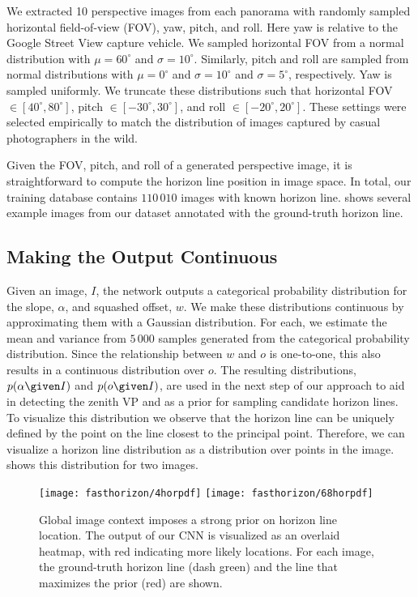 We extracted 10 perspective images from each panorama with randomly
sampled horizontal field-of-view (FOV), yaw, pitch, and roll. Here yaw
is relative to the Google Street View capture vehicle. We sampled
horizontal FOV from a normal distribution with $\mu=60^\circ$ and
$\sigma=10^\circ$. Similarly, pitch and roll are sampled from normal
distributions with $\mu=0^\circ$ and $\sigma=10^\circ$ and
$\sigma=5^\circ$, respectively. Yaw is sampled uniformly.  We truncate
these distributions such that horizontal FOV $\in [40^\circ,
80^\circ]$, pitch $\in [-30^\circ, 30^\circ]$, and roll $\in
[-20^\circ, 20^\circ]$. These settings were selected empirically to
match the distribution of images captured by casual photographers in
the wild.

Given the FOV, pitch, and roll of a generated perspective image, it is
straightforward to compute the horizon line position in image space.
In total, our training database contains $110\,010$ images with known
horizon line.   shows several example images from
our dataset annotated with the ground-truth horizon line.

\subsection{Making the Output Continuous}

Given an image, $I$, the network outputs a categorical probability
distribution for the slope, $\alpha$, and squashed offset, $w$. We
make these distributions continuous by approximating them with a
Gaussian distribution. For each, we estimate the mean and variance
from $5\,000$ samples generated from the categorical probability
distribution. Since the relationship between $w$ and $o$ is
one-to-one, this also results in a continuous distribution over
$o$. The resulting distributions, $p(\alpha \given I)$ and $p(o \given
I)$, are used in the next step of our approach to aid in detecting the
zenith VP and as a prior for sampling candidate horizon
lines. To visualize this distribution we observe that the horizon line
can be uniquely defined by the point on the line closest to the
principal point. Therefore, we can visualize a horizon line
distribution as a distribution over points in the image.
 shows this distribution for two images.

\begin{figure}
 \centering
 \texttt{[image: fasthorizon/4horpdf]}
 \hfill
 \texttt{[image: fasthorizon/68horpdf]}

 \caption{Global image context imposes a strong prior on horizon line
   location. The output of our CNN is visualized as an overlaid
   heatmap, with red indicating more likely locations. For each image,
   the ground-truth horizon line (dash green) and the line that
   maximizes the prior (red) are shown.}

 \label{fig:horpdf}
\end{figure}

